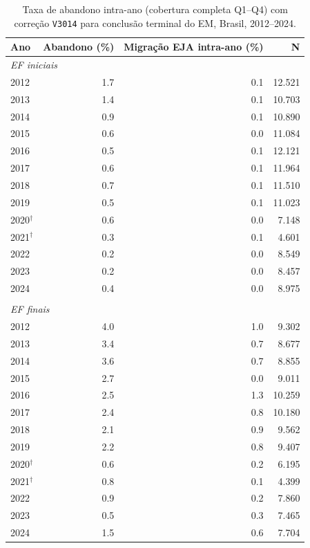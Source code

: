 \begin{table}[htbp]
\centering
\caption{Taxa de abandono intra-ano (cobertura completa Q1--Q4) com corre\c{c}\~ao \texttt{V3014} para conclus\~ao terminal do EM, Brasil, 2012--2024.}
\label{tab:abandono_fullyear}
\begin{threeparttable}
\small
\begin{tabular}{lrrr}
\toprule
Ano & Abandono (\%) & Migra\c{c}\~ao EJA intra-ano (\%) & N \\
\midrule
\multicolumn{4}{l}{\textit{EF iniciais}} \\
\midrule
2012 & 1.7 & 0.1 & 12.521 \\
2013 & 1.4 & 0.1 & 10.703 \\
2014 & 0.9 & 0.1 & 10.890 \\
2015 & 0.6 & 0.0 & 11.084 \\
2016 & 0.5 & 0.1 & 12.121 \\
2017 & 0.6 & 0.1 & 11.964 \\
2018 & 0.7 & 0.1 & 11.510 \\
2019 & 0.5 & 0.1 & 11.023 \\
2020$^{\dagger}$ & 0.6 & 0.0 & 7.148 \\
2021$^{\dagger}$ & 0.3 & 0.1 & 4.601 \\
2022 & 0.2 & 0.0 & 8.549 \\
2023 & 0.2 & 0.0 & 8.457 \\
2024 & 0.4 & 0.0 & 8.975 \\
\\[0.3em]
\multicolumn{4}{l}{\textit{EF finais}} \\
\midrule
2012 & 4.0 & 1.0 & 9.302 \\
2013 & 3.4 & 0.7 & 8.677 \\
2014 & 3.6 & 0.7 & 8.855 \\
2015 & 2.7 & 0.0 & 9.011 \\
2016 & 2.5 & 1.3 & 10.259 \\
2017 & 2.4 & 0.8 & 10.180 \\
2018 & 2.1 & 0.9 & 9.562 \\
2019 & 2.2 & 0.8 & 9.407 \\
2020$^{\dagger}$ & 0.6 & 0.2 & 6.195 \\
2021$^{\dagger}$ & 0.8 & 0.1 & 4.399 \\
2022 & 0.9 & 0.2 & 7.860 \\
2023 & 0.5 & 0.3 & 7.465 \\
2024 & 1.5 & 0.6 & 7.704 \\

\end{tabular}
\end{threeparttable}
\end{table}
